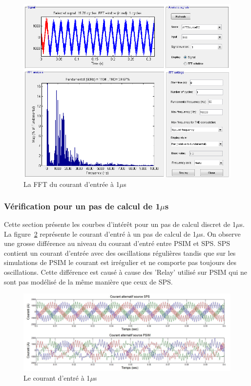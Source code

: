 \documentclass[11pt,letterpaper,final]{report}
\begin{document}
\begin{figure}[htb]
\centering
\includegraphics[scale=0.5]{Fig/AFERC/FFTAnalysisToolResult5u.png}
\caption{La FFT du courant d'entrée à 1$\mu$s}
\label{fft_RC}
\end{figure}


\subsubsection{Vérification pour un pas de calcul de 1$\mu$s}
Cette section présente les courbes d'intérêt pour un pas de calcul discret de 1$\mu$s. La figure~\ref{AF_RC_cou} représente le courant d'entré à un pas de calcul de 1$\mu$s. On observe une grosse différence au niveau du courant d'entré entre PSIM et SPS. SPS contient un courant d'entrée avec des oscillations régulières tandis que sur les simulations de PSIM le courant est irrégulier et ne comporte pas toujours des oscillations. Cette différence est causé à cause des 'Relay' utilisé sur PSIM qui ne sont pas modélisé de la même manière que ceux de SPS.




\begin{figure}[htb]
\centering
\includegraphics[scale=0.5]{Fig/AFERC/cour_al.jpg}
\caption{Le courant d'entré à 1$\mu$s}
\label{AF_RC_cou}
\end{figure}
\end{document}
